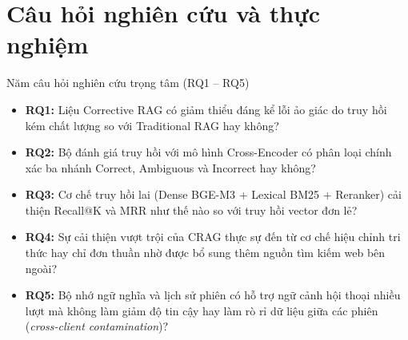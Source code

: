\section{Câu hỏi nghiên cứu và thực nghiệm}

\begin{infobox}{Năm câu hỏi nghiên cứu trọng tâm (RQ1 -- RQ5)}
\begin{itemize}
    \item \textbf{RQ1:} Liệu Corrective RAG có giảm thiểu đáng kể lỗi ảo giác do truy hồi kém chất lượng so với Traditional RAG hay không?
    \item \textbf{RQ2:} Bộ đánh giá truy hồi với mô hình Cross-Encoder có phân loại chính xác ba nhánh Correct, Ambiguous và Incorrect hay không?
    \item \textbf{RQ3:} Cơ chế truy hồi lai (Dense BGE-M3 + Lexical BM25 + Reranker) cải thiện Recall@K và MRR như thế nào so với truy hồi vector đơn lẻ?
    \item \textbf{RQ4:} Sự cải thiện vượt trội của CRAG thực sự đến từ cơ chế hiệu chỉnh tri thức hay chỉ đơn thuần nhờ được bổ sung thêm nguồn tìm kiếm web bên ngoài?
    \item \textbf{RQ5:} Bộ nhớ ngữ nghĩa và lịch sử phiên có hỗ trợ ngữ cảnh hội thoại nhiều lượt mà không làm giảm độ tin cậy hay làm rò rỉ dữ liệu giữa các phiên (\textit{cross-client contamination})?
\end{itemize}
\end{infobox}
